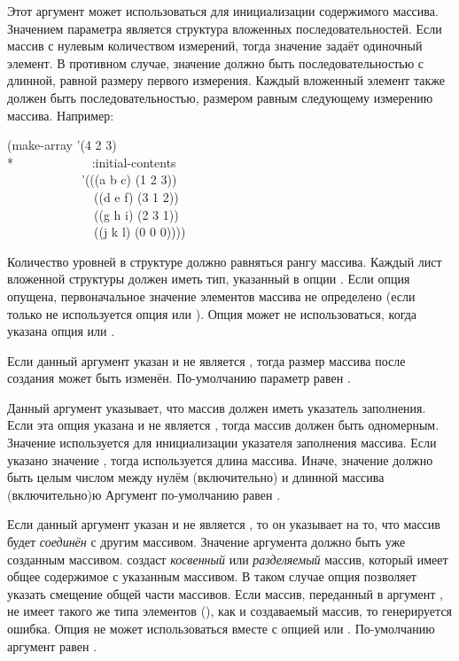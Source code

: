 \begin{defun}[Функция]
\begin{flushdesc}
\item[\cd{:initial-contents}]
Этот аргумент может использоваться для инициализации содержимого
массива. Значением параметра является структура вложенных
последовательностей. Если массив с нулевым количеством измерений, тогда значение
задаёт одиночный элемент. В противном случае, значение должно быть
последовательностью с длинной, равной размеру первого измерения. Каждый
вложенный элемент также должен быть последовательностью, размером равным
следующему измерению массива.
Например:
\begin{lisp}
(make-array '(4 2 3) \\*
~~~~~~~~~~~~:initial-contents \\
~~~~~~~~~~~~'(((a b c) (1 2 3)) \\
~~~~~~~~~~~~~~((d e f) (3 1 2)) \\
~~~~~~~~~~~~~~((g h i) (2 3 1)) \\
~~~~~~~~~~~~~~((j k l) (0 0 0))))
\end{lisp}
Количество уровней в структуре должно равняться рангу массива.
Каждый лист вложенной структуры должен иметь тип, указанный в опции
. Если опция  опущена, первоначальное значение
элементов массива не определено (если только не используется опция
 или ).
Опция  может не использоваться, когда указана опция
 или .

\item[\cd{:adjustable}]
Если данный аргумент указан и не является {\false}, тогда размер массива после
создания может быть изменён. По-умолчанию параметр равен {\false}.

\item[\cd{:fill-pointer}]
Данный аргумент указывает, что массив должен иметь указатель заполнения.
Если эта опция указана и не является {\false}, тогда массив должен быть
одномерным.
Значение используется для инициализации указателя заполнения массива.
Если указано значение {\true}, тогда используется длина массива.
Иначе, значение должно быть целым числом между нулём (включительно) и длинной
массива (включительно)ю
Аргумент по-умолчанию равен {\nil}.

\item[\cd{:displaced-to}]
Если данный аргумент указан и не является {\false}, то он указывает на то, что
массив будет \emph{соединён} с другим массивом.
Значение аргумента должно быть уже созданным массивом.
 создаст \emph{косвенный} или \emph{разделяемый} массив, который
имеет общее содержимое с указанным массивом. В таком случае опция
 позволяет указать смещение общей части массивов.
Если массив, переданный в аргумент , не имеет такого же типа
элементов (), как и создаваемый массив, то генерируется
ошибка.
Опция  не может использоваться вместе с опцией 
или .
По-умолчанию аргумент равен {\nil}.


\end{flushdesc}
\end{defun}
